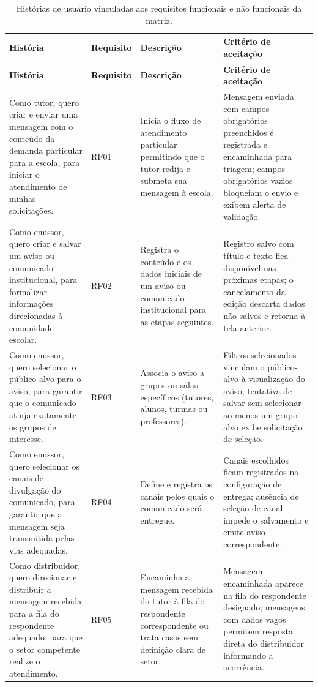 \documentclass[a4paper,12pt]{report}
\begin{document}
\begin{longtable}{|p{3.8cm}|p{1.8cm}|p{4.2cm}|p{4.8cm}|}
\caption{Histórias de usuário vinculadas aos requisitos funcionais e não funcionais da matriz.} \label{tab:historias-usuario} \\
\hline
\textbf{História} & \textbf{Requisito} & \textbf{Descrição} & \textbf{Critério de aceitação} \\
\hline
\endfirsthead
\hline
\textbf{História} & \textbf{Requisito} & \textbf{Descrição} & \textbf{Critério de aceitação} \\
\hline
\endhead
Como tutor, quero criar e enviar uma mensagem com o conteúdo da demanda particular para a escola, para iniciar o atendimento de minhas solicitações. & RF01 & Inicia o fluxo de atendimento particular permitindo que o tutor redija e submeta sua mensagem à escola. & Mensagem enviada com campos obrigatórios preenchidos é registrada e encaminhada para triagem; campos obrigatórios vazios bloqueiam o envio e exibem alerta de validação. \\
\hline
Como emissor, quero criar e salvar um aviso ou comunicado institucional, para formalizar informações direcionadas à comunidade escolar. & RF02 & Registra o conteúdo e os dados iniciais de um aviso ou comunicado institucional para as etapas seguintes. & Registro salvo com título e texto fica disponível nas próximas etapas; o cancelamento da edição descarta dados não salvos e retorna à tela anterior. \\
\hline
Como emissor, quero selecionar o público-alvo para o aviso, para garantir que o comunicado atinja exatamente os grupos de interesse. & RF03 & Associa o aviso a grupos ou salas específicos (tutores, alunos, turmas ou professores). & Filtros selecionados vinculam o público-alvo à visualização do aviso; tentativa de salvar sem selecionar ao menos um grupo-alvo exibe solicitação de seleção. \\
\hline
Como emissor, quero selecionar os canais de divulgação do comunicado, para garantir que a mensagem seja transmitida pelas vias adequadas. & RF04 & Define e registra os canais pelos quais o comunicado será entregue. & Canais escolhidos ficam registrados na configuração de entrega; ausência de seleção de canal impede o salvamento e emite aviso correspondente. \\
\hline
Como distribuidor, quero direcionar e distribuir a mensagem recebida para a fila do respondente adequado, para que o setor competente realize o atendimento. & RF05 & Encaminha a mensagem recebida do tutor à fila do respondente correspondente ou trata casos sem definição clara de setor. & Mensagem encaminhada aparece na fila do respondente designado; mensagens com dados vagos permitem resposta direta do distribuidor informando a ocorrência. \\

\end{longtable}
\end{document}
